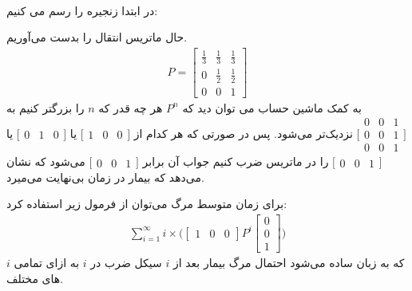 \\\noindent
در ابتدا زنجیره را رسم می کنیم:
\begin{latin}
    \begin{center}
    \end{center}
\end{latin}
حال ماتریس انتقال را بدست می‌آوریم.
\begin{gather*}
    P = \begin{bmatrix}
        \frac{1}{3} & \frac{1}{3} & \frac{1}{3}\\
        0 & \frac{1}{2} & \frac{1}{2} \\
        0 & 0 & 1
    \end{bmatrix}
\end{gather*}
به کمک ماشین حساب می توان دید که
$P^n$
هر چه قدر که
$n$
را بزرگتر کنیم به
$\big[\begin{smallmatrix}
    0 & 0 & 1\\
    0 & 0 & 1 \\
    0 & 0 & 1
\end{smallmatrix}\big]$
نزدیک‌تر می‌شود. پس در صورتی که هر کدام از
$\big[\begin{smallmatrix}
    1 & 0 & 0
\end{smallmatrix}\big]$
یا
$\big[\begin{smallmatrix}
    0 & 1 & 0
\end{smallmatrix}\big]$
یا
$\big[\begin{smallmatrix}
    0 & 0 & 1
\end{smallmatrix}\big]$
را در ماتریس ضرب کنیم جواب آن برابر
$\big[\begin{smallmatrix}
    0 & 0 & 1
\end{smallmatrix}\big]$
می‌شود که نشان می‌دهد که بیمار در زمان بی‌نهایت می‌میرد.

برای زمان متوسط مرگ می‌توان از فرمول زیر استفاده کرد:
\begin{gather*}
    \sum_{i=1}^{\infty} i \times \big(\begin{bmatrix}
        1 & 0 & 0
    \end{bmatrix} P^i \begin{bmatrix}
        0 \\ 0 \\ 1
    \end{bmatrix}\big)
\end{gather*}
که به زبان ساده می‌شود احتمال مرگ بیمار بعد از
$i$
سیکل ضرب در
$i$
به ازای تمامی
$i$های
مختلف.



